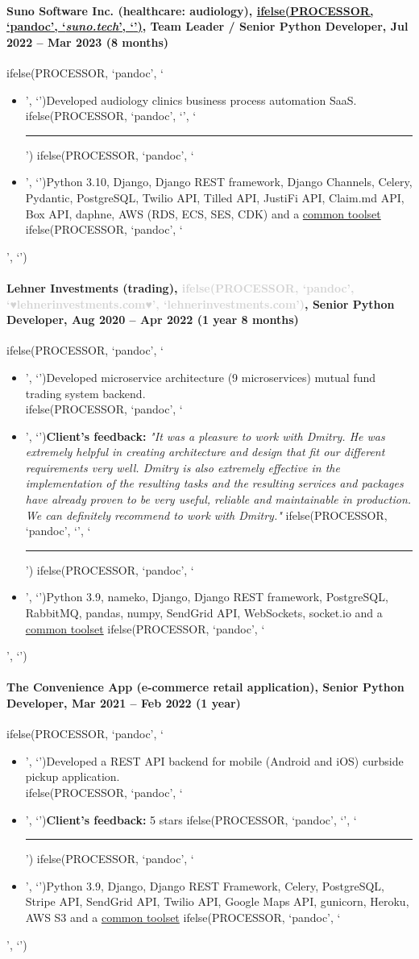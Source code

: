 \documentclass[a4paper,8pt]{extarticle}
\newcommand{\chref}[2]{\href{#1}
{ifelse(PROCESSOR, `pandoc', `#2', `\underline{\smash{#2}}')}}
\newcommand{\itchref}[2]{\chref{#1}{\textit{#2}}}  %
\newcommand{\chrule}{ifelse(PROCESSOR, `pandoc', `', `\vspace{3pt}\hrule')}
\newcommand{\brokenhreflg}[1]{\textcolor{lightgray}{ifelse(PROCESSOR, `pandoc', `♥#1♥', `#1')}}
\newcommand{\pdbeginitemize}{ifelse(PROCESSOR, `pandoc', `\begin{itemize}', `')}
\newcommand{\pditem}{ifelse(PROCESSOR, `pandoc', `\item', `')}
\newcommand{\pdenditemize}{ifelse(PROCESSOR, `pandoc', `\end{itemize}', `')}
\begin{document}
\paragraph*{Suno Software Inc. (healthcare: audiology), \itchref{https://suno.tech}{suno.tech}, Team Leader / Senior Python Developer, Jul 2022 -- Mar 2023 (8 months)}
\pdbeginitemize
\pditem Developed audiology clinics business process automation SaaS.
\chrule
\pditem Python 3.10, Django, Django REST framework, Django Channels, Celery, Pydantic, PostgreSQL, Twilio API, Tilled API, JustiFi API, Claim.md API, Box API, daphne, AWS (RDS, ECS, SES, CDK) and a \hyperlink{common-toolset}{common toolset}
\pdenditemize

\paragraph*{Lehner Investments (trading), \brokenhreflg{lehnerinvestments.com}, \textbf{Senior Python Developer}, Aug 2020 -- Apr 2022 (1 year 8 months)}
\pdbeginitemize
\pditem Developed microservice architecture (9 microservices) mutual fund trading system backend.\\
\pditem \textbf{Client's feedback:} \textit{"It was a pleasure to work with Dmitry. He was extremely helpful in creating architecture and design that fit our different requirements very well. Dmitry is also extremely effective in the implementation of the resulting tasks and the resulting services and packages have already proven to be very useful, reliable and maintainable in production. We can definitely recommend to work with Dmitry."}
\chrule
\pditem Python 3.9, nameko, Django, Django REST framework, PostgreSQL, RabbitMQ, pandas, numpy, SendGrid API, WebSockets, socket.io and a \hyperlink{common-toolset}{common toolset}
\pdenditemize

\paragraph*{The Convenience App (e-commerce retail application), Senior Python Developer, Mar 2021 -- Feb 2022 (1 year)}
\pdbeginitemize
\pditem Developed a REST API backend for mobile (Android and iOS) curbside pickup application.\\
\pditem \textbf{Client's feedback:} 5 stars
\chrule
\pditem Python 3.9, Django, Django REST Framework, Celery, PostgreSQL, Stripe API, SendGrid API, Twilio API, Google Maps API, gunicorn, Heroku, AWS S3 and a \hyperlink{common-toolset}{common toolset}
\pdenditemize
\end{document}
